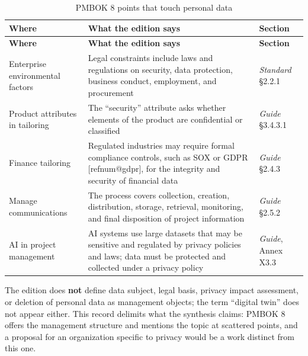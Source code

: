 \documentclass[11pt,a4paper]{article}
\makeatletter
\newcommand{\refnum}[1]{\csname refnum@#1\endcsname}
\newcommand{\cit}[1]{[\refnum{#1}]}
\newcommand{\SingleSpacing}{}
\newcommand{\fontetab}[1]{\par\vspace{3pt}{\small\noindent Source: #1\par}}
\makeatother
\begin{document}
\begingroup\SingleSpacing\small
\begin{longtable}{@{}>{\raggedright\arraybackslash}p{}>{\raggedright\arraybackslash}p{}>{\raggedright\arraybackslash}p{}@{}}
\caption{PMBOK 8 points that touch personal data}\label{tab:t13}\\
\toprule
\textbf{Where} & \textbf{What the edition says} & \textbf{Section}\\
\midrule
\endfirsthead
\toprule
\textbf{Where} & \textbf{What the edition says} & \textbf{Section}\\
\midrule
\endhead
\bottomrule
\endfoot
\bottomrule
\endlastfoot
Enterprise environmental factors & Legal constraints include laws and regulations on security, data protection, business conduct, employment, and procurement & \textit{Standard} §2.2.1\\[3pt]
Product attributes in tailoring & The \textquotedblleft{}security\textquotedblright{} attribute asks whether elements of the product are confidential or classified & \textit{Guide} §3.4.3.1\\[3pt]
Finance tailoring & Regulated industries may require formal compliance controls, such as SOX or GDPR [\refnum{gdpr}], for the integrity and security of financial data & \textit{Guide} §2.4.3\\[3pt]
Manage communications & The process covers collection, creation, distribution, storage, retrieval, monitoring, and final disposition of project information & \textit{Guide} §2.5.2\\[3pt]
AI in project management & AI systems use large datasets that may be sensitive and regulated by privacy policies and laws; data must be protected and collected under a privacy policy & \textit{Guide}, Annex X3.3\\[3pt]
\end{longtable}
\endgroup
\fontetab{Prepared by the authors (2026), based on \cit{pmi}.}

The edition does \textbf{not} define data subject, legal basis, privacy impact assessment, or deletion of personal data as management objects; the term \textquotedblleft{}digital twin\textquotedblright{} does not appear either. This record delimits what the synthesis claims: PMBOK 8 offers the management structure and mentions the topic at scattered points, and a proposal for an organization specific to privacy would be a work distinct from this one.
\end{document}
